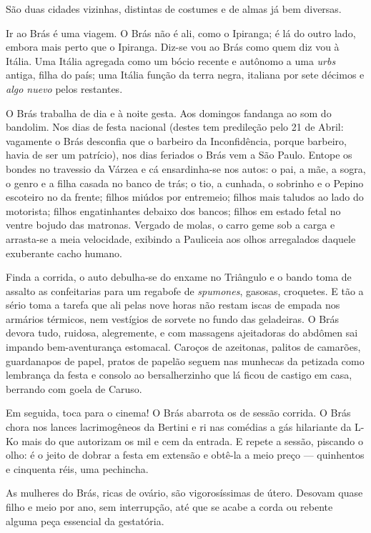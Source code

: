 São duas cidades vizinhas, distintas de costumes e de almas já bem
diversas.

Ir ao Brás é uma viagem. O Brás não é ali, como o Ipiranga; é lá do
outro lado, embora mais perto que o Ipiranga. Diz-se vou ao Brás como
quem diz vou à Itália. Uma Itália agregada como um bócio recente e
autônomo a uma \emph{urbs} antiga, filha do país; uma Itália função da
terra negra, italiana por sete décimos e \emph{algo nuevo} pelos
restantes.

O Brás trabalha de dia e à noite gesta. Aos domingos fandanga ao som do
bandolim. Nos dias de festa nacional (destes tem predileção pelo 21 de
Abril: vagamente o Brás desconfia que o barbeiro da Inconfidência,
porque barbeiro, havia de ser um patrício), nos dias feriados o Brás vem
a São Paulo. Entope os bondes no travessio da Várzea e cá ensardinha-se
nos autos: o pai, a mãe, a sogra, o genro e a filha casada no banco de
trás; o tio, a cunhada, o sobrinho e o Pepino escoteiro no da frente;
filhos miúdos por entremeio; filhos mais taludos ao lado do motorista;
filhos engatinhantes debaixo dos bancos; filhos em estado fetal no
ventre bojudo das matronas. Vergado de molas, o carro geme sob a carga e
arrasta-se a meia velocidade, exibindo a Pauliceia aos olhos arregalados
daquele exuberante cacho humano.

Finda a corrida, o auto debulha-se do enxame no Triângulo e o bando toma
de assalto as confeitarias para um regabofe de \emph{spumones}, gasosas,
croquetes. E tão a sério toma a tarefa que ali pelas nove horas não
restam iscas de empada nos armários térmicos, nem vestígios de sorvete
no fundo das geladeiras. O Brás devora tudo, ruidosa, alegremente, e com
massagens ajeitadoras do abdômen sai impando bem-aventurança estomacal.
Caroços de azeitonas, palitos de camarões, guardanapos de papel, pratos
de papelão seguem nas munhecas da petizada como lembrança da festa e
consolo ao bersalherzinho que lá ficou de castigo em casa, berrando com
goela de Caruso.

Em seguida, toca para o cinema! O Brás abarrota os de sessão corrida. O
Brás chora nos lances lacrimogêneos da Bertini e ri nas comédias a gás
hilariante da L-Ko mais do que autorizam os mil e cem da entrada. E
repete a sessão, piscando o olho: é o jeito de dobrar a festa em
extensão e obtê-la a meio preço --- quinhentos e cinquenta réis, uma
pechincha.

As mulheres do Brás, ricas de ovário, são vigorosíssimas de útero.
Desovam quase filho e meio por ano, sem interrupção, até que se acabe a
corda ou rebente alguma peça essencial da gestatória.

